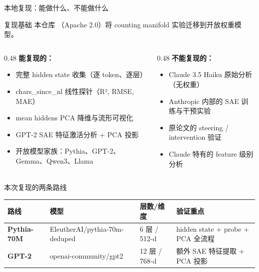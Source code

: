 % 

\begin{frame}{本地复现：能做什么、不能做什么}
\small
\begin{block}{复现基础}
本仓库 （Apache 2.0）将 counting manifold 实验迁移到开放权重模型。
\end{block}

\begin{columns}[T,onlytextwidth]
\begin{column}{0.48\linewidth}
\textbf{能复现的：}
\begin{itemize}
  \item 完整 hidden state 收集（逐 token、逐层）
  \item chars\_since\_nl 线性探针（R², RMSE, MAE）
  \item mean hiddens PCA 降维与流形可视化
  \item GPT-2 SAE 特征激活分析 + PCA 投影
  \item 开放模型家族：Pythia、GPT-2、Gemma、Qwen3、Llama
\end{itemize}
\end{column}
\begin{column}{0.48\linewidth}
\textbf{不能复现的：}
\begin{itemize}
  \item Claude 3.5 Haiku 原始分析（无权重）
  \item Anthropic 内部的 SAE 训练与干预实验
  \item 原论文的 steering / intervention 验证
  \item Claude 特有的 feature 级别分析
\end{itemize}
\end{column}
\end{columns}

\vspace{0.4em}
\begin{block}{本次复现的两条路线}
\begin{tabularx}{\linewidth}{lllX}
\toprule
路线 & 模型 & 层数/维度 & 验证重点 \\
\midrule
\textbf{Pythia-70M} & EleutherAI/pythia-70m-deduped & 6 层 / 512-d & hidden state + probe + PCA 全流程 \\
\textbf{GPT-2} & openai-community/gpt2 & 12 层 / 768-d & 额外 SAE 特征提取 + PCA 投影 \\
\bottomrule
\end{tabularx}
\end{block}
\end{frame}

